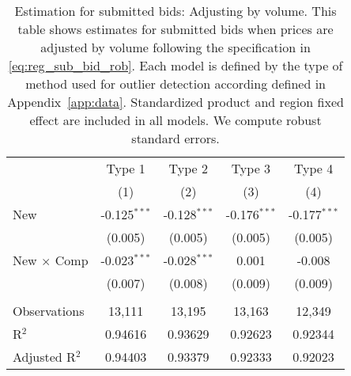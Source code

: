 
\begin{table}[H]
   \label{app:tab:volume_adj}
   \bigskip
   \centering
   \begin{tabular}{lcccc}
      \toprule
                                & Type 1         & Type 2         & Type 3         & Type 4 \\   
                                & (1)            & (2)            & (3)            & (4)\\  
      \midrule 
      New                       & -0.125$^{***}$ & -0.128$^{***}$ & -0.176$^{***}$ & -0.177$^{***}$\\   
                                & (0.005)        & (0.005)        & (0.005)        & (0.005)\\   
      New $\times$ Comp  & -0.023$^{***}$ & -0.028$^{***}$ & 0.001          & -0.008\\   
                                & (0.007)        & (0.008)        & (0.009)        & (0.009)\\   
       \\
      Observations             & 13,111         & 13,195         & 13,163         & 12,349\\  
      R$^2$                     & 0.94616        & 0.93629        & 0.92623        & 0.92344\\  
      Adjusted R$^2$            & 0.94403        & 0.93379        & 0.92333        & 0.92023\\  
      \bottomrule
   \end{tabular}
   
   \par \raggedright 
   \caption{\label{tab:estsub_vol} Estimation for submitted bids: Adjusting by volume. This table shows estimates for submitted bids  when prices are adjusted by volume following the specification in \eqref{eq:reg_sub_bid_rob}. Each model is defined by the type of method used for outlier detection according defined in Appendix~\ref{app:data}. Standardized product and region fixed effect are included in all models. We compute robust standard errors.}
\end{table}


